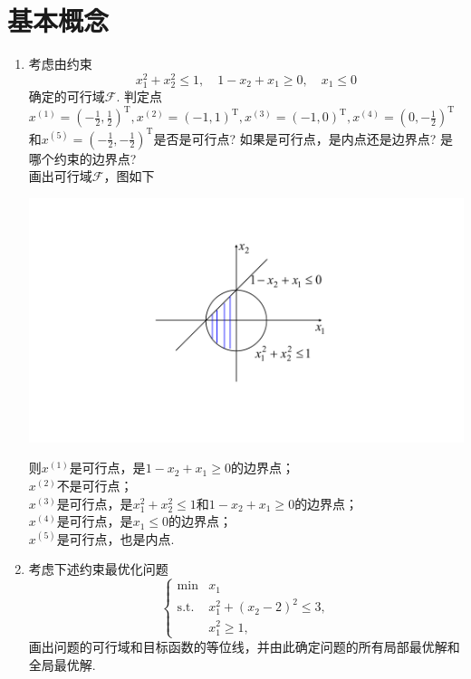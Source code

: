 \section{基本概念}
\begin{enumerate}
    \item 考虑由约束
    \[x_1^2+x_2^2 \leqslant 1,\quad 1-x_2+x_1 \geqslant 0, \quad x_1 \leqslant 0\]确定的可行域$\mathcal{F}$. 判定点$\displaystyle x^{(1)}=\left(-\frac{1}{2},\frac{1}{2}\right)^{\mathrm{T}},x^{(2)}=(-1,1)^{\mathrm{T}},x^{(3)}=(-1,0)^{\mathrm{T}},x^{(4)}=\left(0,-\frac{1}{2}\right)^{\mathrm{T}}$和$\displaystyle x^{(5)}=\left(-\frac{1}{2},-\frac{1}{2}\right)^{\mathrm{T}}$是否是可行点? 如果是可行点，是内点还是边界点? 是哪个约束的边界点?\\
    \sol 画出可行域$\mathcal{F}$，图如下
    \begin{center}
        \includegraphics[scale=0.35]{1-1.pdf}
    \end{center}
    则$x^{(1)}$是可行点，是$1-x_2+x_1 \geqslant 0$的边界点；\\
    $x^{(2)}$不是可行点；\\
    $x^{(3)}$是可行点，是$x_1^2+x_2^2 \leqslant 1$和$1-x_2+x_1 \geqslant 0$的边界点；\\
    $x^{(4)}$是可行点，是$x_1 \leqslant 0$的边界点；\\
    $x^{(5)}$是可行点，也是内点.
    \item 考虑下述约束最优化问题
    \[\begin{cases}
        \min & x_1\\
        \mathrm{s.t.} & x_1^2+(x_2-2)^2 \leqslant 3,\\
        & x_1^2 \geqslant 1,
    \end{cases}\]
    画出问题的可行域和目标函数的等位线，并由此确定问题的所有局部最优解和全局最优解.\\

\end{enumerate}
